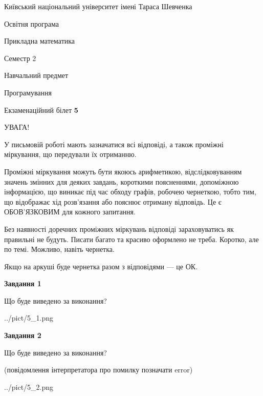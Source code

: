 \documentclass[12pt, ukrainian]{article}
\begin{document}
{{\begin {small}\par
{ \center  Київський національний університет імені Тараса Шевченка \par}
{\parbox {5 cm}{Освітня програма \hfill}{\parbox {7 cm}{Прикладна математика\hfill}}\parbox {6 cm}{\hfill Семестр 2}}\par
{\parbox {5 cm} {Навчальний предмет \hfill}\parbox {7 cm}{Програмування \hfill}\parbox {6cm}{\hfill}\par}\vspace{-7pt} \end{small}}{\center Екзаменаційний білет \No \textbf
{ 5 }\par}}
{
\begin {large}
УВАГА!

У письмовій роботі мають зазначатися всі відповіді, а також проміжні міркування, що передували їх отриманню.

Проміжні міркування можуть бути якоюсь арифметикою, відслідковуванням зна\-чень змінних для деяких завдань,
короткими поясненнями, допоміжною інформацією, що виникає під час обходу графів, робочею чернеткою,
тобто тим, що відображає хід розв’язання або пояснює отриману відповідь.
Це є ОБОВ’ЯЗКОВИМ для кожного запитання.

Без наявності доречних проміжних міркувань відповіді зараховуватись як правиль\-ні не будуть.
Писати багато та красиво оформлено не треба. Коротко, але по темі. Можли\-во, навіть чернетка.

Якщо на аркуші буде чернетка разом з відповідями --- це ОК.

\newpage

{\begin {center}\textbf{Завдання 1}\end {center}}\par
Що буде виведено за виконання?\par
\begin{center}
	{../pict/5_1.png}
\end{center}
\newpage

{\begin {center}\textbf{Завдання 2}\end {center}}\par
Що буде виведено за виконання?\par
 (повідомлення інтерпретатора про помилку позначати error)\par
\begin{center}
	{../pict/5_2.png}
\end{center}
\newpage


\end{large}}
\end{document}
